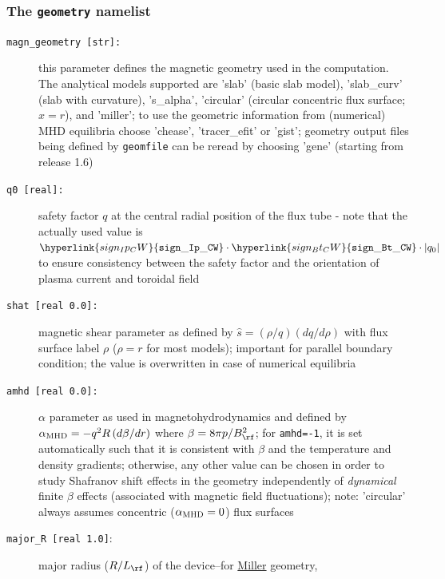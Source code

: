 \documentclass[12pt]{article}
\begin{document}
\subsubsection{The \texttt{geometry} namelist}
\hypertarget{geometry_nml}{}
\begin{description}
\item[\hypertarget{magn_geometry}{\tt magn\_geometry [str]:}] this parameter defines the magnetic geometry used in the computation.
  The analytical models supported are 'slab' (basic slab model), 'slab\_curv' (slab with curvature),
  's\_alpha', 'circular' (circular concentric flux surface; $x = r$), and 'miller';
  to use the geometric information from
  (numerical) MHD equilibria choose 'chease', 'tracer\_efit' or 'gist';
  \gene geometry output files being defined by \texttt{geomfile} can be reread
  by choosing 'gene' (starting from release 1.6)
%
%
\item[{\parbox[t]{0.9\linewidth}{additional parameters for analytical equilibrium models\\
 's\_alpha', 'circular', and 'miller':}}]
\item[\hypertarget{q0}{\texttt{q0 [real]:}}] safety factor $q$ at the central radial position of the flux tube - note that the actually used value is $\hyperlink{sign_Ip_CW}{\tt sign\_Ip\_CW}\cdot\hyperlink{sign_Bt_CW}{\tt sign\_Bt\_CW}\cdot|q_0|$ to ensure consistency between the safety factor and the orientation of plasma current and toroidal field
\item[\texttt{shat [real 0.0]:}] magnetic shear parameter as defined by $\hat s=(\rho/q)(dq/d\rho)$ with flux surface label $\rho$
 ($\rho = r$ for most models); important for parallel boundary condition; the value is overwritten in case of numerical equilibria
\item[\texttt{amhd [real 0.0]:}] $\alpha$ parameter as used in magnetohydrodynamics and defined by
  $\alpha_{\rm MHD}=-q^2R\,(d\beta/dr)$ where $\beta=8\pi p/B_\rf^2$; for \texttt{amhd=-1}, it is set automatically
  such that it is consistent with $\beta$ and the temperature and density gradients; otherwise, any
  other value can be chosen in order to study Shafranov shift effects in the geometry independently of
  {\em dynamical} finite $\beta$ effects (associated with magnetic field fluctuations); note: 'circular' always assumes
  concentric ($\alpha_{\rm MHD} = 0$) flux surfaces
\item[\hypertarget{major_R}{\texttt{major\_R [real 1.0]}}:] major radius ($R/L_\rf$) of the device--for \hyperlink{desc:miller}{Miller} geometry,

\end{description}
\end{document}
